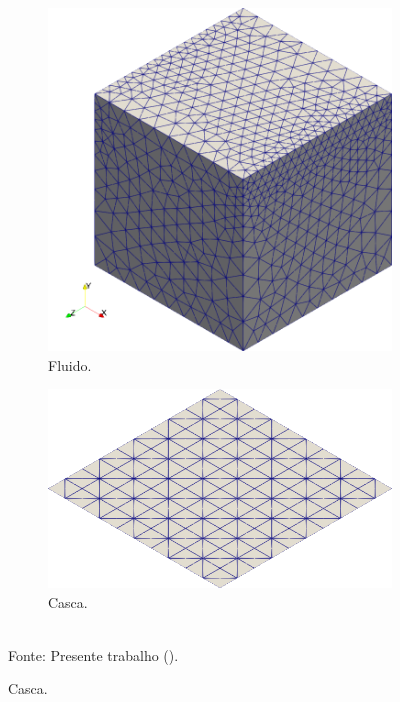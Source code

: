\begin{figure}[h!]
    \centering
    \caption{Cavidade tridimensional - Malhas utilizadas para o problema.}
    \begin{subfigure}[b]{0.4\textwidth}
        \includegraphics[width=\linewidth]{Figuras/FSI-Cavity3D/fluid-mesh.png}
        \caption{Fluido.}
    \end{subfigure}
    \begin{subfigure}[b]{0.4\textwidth}
        \includegraphics[width=\linewidth]{Figuras/FSI-Cavity3D/shell-mesh.png}
        \caption{Casca.}
    \end{subfigure}
    \\Fonte: Presente trabalho (\the\year).
    \label{fig:Cavity3D-mesh}
\end{figure}

